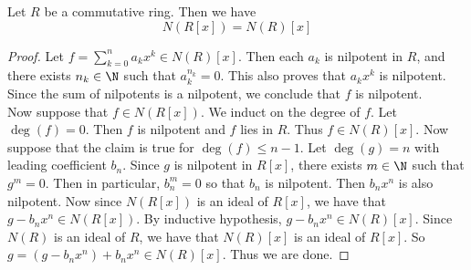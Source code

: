 \documentclass[a4paper]{article}
\begin{document}
\begin{prp}{}{} Let $R$ be a commutative ring. Then we have $$N(R[x])=N(R)[x]$$ 
\begin{proof}
Let $f=\sum_{k=0}^na_kx^k\in N(R)[x]$. Then each $a_k$ is nilpotent in $R$, and there exists $n_k\in\N$ such that $a_k^{n_k}=0$. This also proves that $a_kx^k$ is nilpotent. Since the sum of nilpotents is a nilpotent, we conclude that $f$ is nilpotent. \\

Now suppose that $f\in N(R[x])$. We induct on the degree of $f$. Let $\deg(f)=0$. Then $f$ is nilpotent and $f$ lies in $R$. Thus $f\in N(R)[x]$. Now suppose that the claim is true for $\deg(f)\leq n-1$. Let $\deg(g)=n$ with leading coefficient $b_n$. Since $g$ is nilpotent in $R[x]$, there exists $m\in\N$ such that $g^m=0$. Then in particular, $b_n^m=0$ so that $b_n$ is nilpotent. Then $b_nx^n$ is also nilpotent. Now since $N(R[x])$ is an ideal of $R[x]$, we have that $g-b_nx^n\in N(R[x])$. By inductive hypothesis, $g-b_nx^n\in N(R)[x]$. Since $N(R)$ is an ideal of $R$, we have that $N(R)[x]$ is an ideal of $R[x]$. So $g=(g-b_nx^n)+b_nx^n\in N(R)[x]$. Thus we are done. 
\end{proof}
\end{prp}
\end{document}
